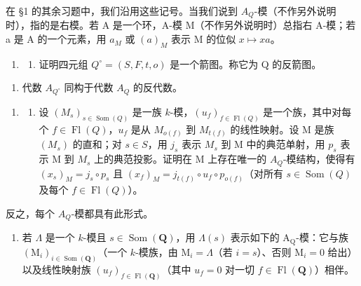 在 §1 的其余习题中，我们沿用这些记号。当我们说到 \(A_{Q}\)-模（不作另外说明时），指的是右模。若 A 是一个环，A-模 M（不作另外说明时）总指右 A-模；若 a 是 A 的一个元素，用 \(a_{M}\) 或 \((a)_{M}\) 表示 M 的位似 \(x \mapsto xa\)。

\begin{enumerate}
\def\labelenumi{\arabic{enumi})}
\setcounter{enumi}{4}
\tightlist
\item
  \begin{enumerate}
  \def\labelenumii{\alph{enumii})}
  \tightlist
  \item
    证明四元组 \(Q^{\circ} = (S, F, t, o)\) 是一个箭图。称它为 Q 的反箭图。
  \end{enumerate}
\end{enumerate}

\begin{enumerate}
\def\labelenumi{\alph{enumi})}
\setcounter{enumi}{1}
\tightlist
\item
  代数 \(A_{Q^{\circ}}\) 同构于代数 \(A_{Q}\) 的反代数。
\end{enumerate}

\begin{enumerate}
\def\labelenumi{\arabic{enumi})}
\setcounter{enumi}{5}
\tightlist
\item
  \begin{enumerate}
  \def\labelenumii{\alph{enumii})}
  \tightlist
  \item
    设 \((M_s)_{s\in\operatorname{Som}(Q)}\) 是一族 \(k\)-模，\((u_f)_{f\in\operatorname{Fl}(Q)}\) 是一个族，其中对每个 \(f\in\operatorname{Fl}(Q)\)，\(u_f\) 是从 \(M_{o(f)}\) 到 \(M_{t(f)}\) 的线性映射。设 M 是族 \((M_s)\) 的直和；对 \(s\in S\)，用 \(j_s\) 表示 \(M_s\) 到 M 中的典范单射，用 \(p_s\) 表示 M 到 \(M_s\) 上的典范投影。证明在 M 上存在唯一的 \(A_Q\)-模结构，使得有 \((x_s)_M = j_s \circ p_s\) 且 \((x_f)_M = j_{t(f)} \circ u_f \circ p_{o(f)}\)（对所有 \(s \in \operatorname{Som}(Q)\) 及每个 \(f \in \operatorname{Fl}(Q)\)）。
  \end{enumerate}
\end{enumerate}

反之，每个 \(A_{Q}\)-模都具有此形式。

\begin{enumerate}
\def\labelenumi{\alph{enumi})}
\setcounter{enumi}{1}
\tightlist
\item
  若 \(\Lambda\) 是一个 \(k\)-模且 \(s \in \operatorname{Som}(\mathbf{Q})\)，用 \(\Lambda(s)\) 表示如下的 \(\mathrm{A}_{\mathrm{Q}}\)-模：它与族 \((\mathrm{M}_i)_{i \in \operatorname{Som}(\mathbf{Q})}\)（一个 \(k\)-模族，由 \(\mathrm{M}_i = \Lambda\)（若 \(i = s\)）、否则 \(\mathrm{M}_i = 0\) 给出）以及线性映射族 \((u_f)_{f \in \operatorname{Fl}(\mathbf{Q})}\)（其中 \(u_f = 0\) 对一切 \(f \in \operatorname{Fl}(\mathbf{Q})\)）相伴。
\end{enumerate}

